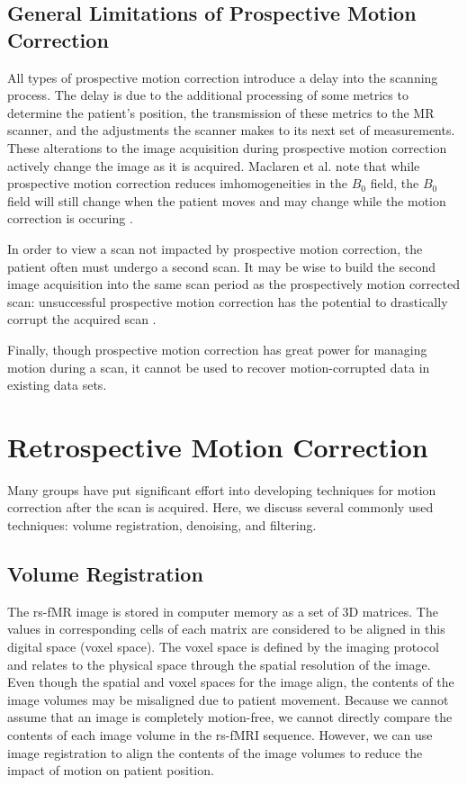 \subsection{General Limitations of Prospective Motion Correction}

All types of prospective motion correction introduce a delay into the scanning process. The delay is due to the additional processing of some metrics to determine the patient's position, the transmission of these metrics to the MR scanner, and the adjustments the scanner makes to its next set of measurements. These alterations to the image acquisition during prospective motion correction actively change the image as it is acquired.
Maclaren et al. note that while prospective motion correction reduces imhomogeneities in the $B_0$ field, the $B_0$ field will still change when the patient moves and may change while the motion correction is occuring \cite{Maclaren2013}. %

In order to view a scan not impacted by prospective motion correction, the patient often must undergo a second scan. It may be wise to build the second image acquisition into the same scan period as the prospectively motion corrected scan: unsuccessful prospective motion correction has the potential to drastically corrupt the acquired scan \cite{Zaitsev2017}.

Finally, though prospective motion correction has great power for managing motion during a scan, it cannot be used to recover motion-corrupted data in existing data sets.


\section{Retrospective Motion Correction}

Many groups have put significant effort into developing techniques for motion correction after the scan is acquired. Here, we discuss several commonly used techniques: volume registration, denoising, and filtering. %

\subsection{Volume Registration}

The rs-fMR image is stored in computer memory as a set of 3D matrices. The values in corresponding cells of each matrix are considered to be aligned in this digital space (voxel space). The voxel space is defined by the imaging protocol and relates to the physical space through the spatial resolution of the image. Even though the spatial and voxel spaces for the image align, the contents of the image volumes may be misaligned due to patient movement. Because we cannot assume that an image is completely motion-free, we cannot directly compare the contents of each image volume in the rs-fMRI sequence. However, we can use image registration to align the contents of the image volumes to reduce the impact of motion on patient position.

